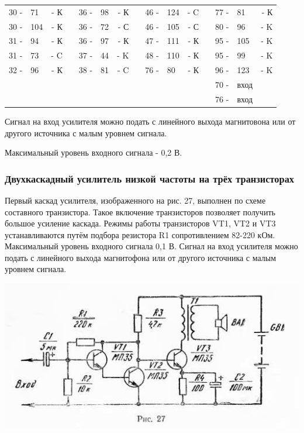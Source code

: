\documentclass[12pt]{article}
\begin{document}
\hrulefill

\begin{tabular}{r l r p{0.5cm} r l r p{0.5cm} r l r p{0.5cm} r l r}
30 - & 71  & - К &   & 36 - & 98 & - К &    &  46 - & 124 & - C &   & 77 - & 81  & - К \\
30 - & 104 & - К &   & 36 - & 72 & - С &    &  46 - & 105 & - С &   & 80 - & 96  & - K \\
31 - & 94  & - К &   & 36 - & 97 & - К &    &  47 - & 111 & - К &   & 95 - & 105 & - K \\
31 - & 73  & - C &   & 37 - & 44 & - K &    &  48 - & 110 & - К &   & 95 - & 99  & - K \\
32 - & 96  & - К &   & 38 - & 81 & - C &    &  76 - & 80  & - К &   & 96 - & 123 & - K \\
     &     &     &   &      &    &     &    &       &     &     &   & 70 - & вход &    \\
     &     &     &   &      &    &     &    &       &     &     &   & 76 - & вход &    \\
\end{tabular}

\hrulefill

Сигнал на вход усилителя можно подать с линейного выхода магнитовона или от другого источника с малым уровнем сигнала.

Максимальный уровень входного сигнала - 0,2 В.

\subsubsection{Двухкаскадный усилитель низкой частоты на трёх транзисторах}

Первый каскад усилителя, изображенного на рис. 27, выполнен по схеме составного транзистора. Такое включение транзисторов позволяет получить большое усиление каскада. Режимы работы транзисторов VT1, VT2 и VT3 устанавливаются путём подбора резистора R1 сопротивлением 82-220 кОм. Максимальный уровень входного сигнала 0,1 В. Сигнал на вход усилителя можно подать с линейного выхода магнитофона или от другого источника с малым уровнем сигнала.

\newpage

\includegraphics[width=\textwidth]{ekon3_024_1}
\end{document}
